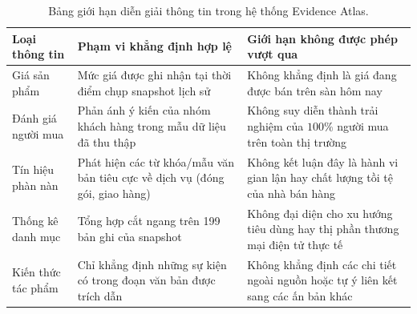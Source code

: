 \begin{table}[htbp]\small
\caption{Bảng giới hạn diễn giải thông tin trong hệ thống Evidence Atlas.}
\begin{tabularx}{\linewidth}{P{33mm}YY}\toprule
Loại thông tin & Phạm vi khẳng định hợp lệ & Giới hạn không được phép vượt qua\\\midrule
Giá sản phẩm & Mức giá được ghi nhận tại thời điểm chụp snapshot lịch sử & Không khẳng định là giá đang được bán trên sàn hôm nay\\
Đánh giá người mua & Phản ánh ý kiến của nhóm khách hàng trong mẫu dữ liệu đã thu thập & Không suy diễn thành trải nghiệm của $100\%$ người mua trên toàn thị trường\\
Tín hiệu phàn nàn & Phát hiện các từ khóa/mẫu văn bản tiêu cực về dịch vụ (đóng gói, giao hàng) & Không kết luận đây là hành vi gian lận hay chất lượng tồi tệ của nhà bán hàng\\
Thống kê danh mục & Tổng hợp cắt ngang trên 199 bản ghi của snapshot & Không đại diện cho xu hướng tiêu dùng hay thị phần thương mại điện tử thực tế\\
Kiến thức tác phẩm & Chỉ khẳng định những sự kiện có trong đoạn văn bản được trích dẫn & Không khẳng định các chi tiết ngoài nguồn hoặc tự ý liên kết sang các ấn bản khác\\\bottomrule
\end{tabularx}
\end{table}
